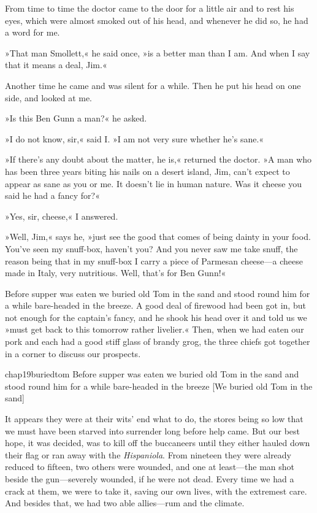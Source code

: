 From time to time the doctor came to the door for a little air and to rest his eyes, which were almost smoked out of his head, and whenever he did so, he had a word for me.

»That man Smollett,« he said once, »is a better man than I am. And when I say that it means a deal, Jim.«

Another time he came and was silent for a while. Then he put his head on one side, and looked at me.

»Is this Ben Gunn a man?« he asked.

»I do not know, sir,« said I. »I am not very sure whether he's sane.«

»If there's any doubt about the matter, he is,« returned the doctor. »A man who has been three years biting his nails on a desert island, Jim, can't expect to appear as sane as you or me. It doesn't lie in human nature. Was it cheese you said he had a fancy for?«

»Yes, sir, cheese,« I answered.

»Well, Jim,« says he, »just see the good that comes of being dainty in your food. You've seen my snuff-box, haven't you? And you never saw me take snuff, the reason being that in my snuff-box I carry a piece of Parmesan cheese—a cheese made in Italy, very nutritious. Well, that's for Ben Gunn!«

Before supper was eaten we buried old Tom in the sand and stood round him for a while bare-headed in the breeze. A good deal of firewood had been got in, but not enough for the captain's fancy, and he shook his head over it and told us we »must get back to this tomorrow rather livelier.« Then, when we had eaten our pork and each had a good stiff glass of brandy grog, the three chiefs got together in a corner to discuss our prospects.


\begin{bwbigpic}
	[\picsize]
	{chap19buriedtom}
	{Before supper was eaten we buried old Tom in the sand and stood round him for a while bare-headed in the breeze}
	[We buried old Tom in the sand]
\end{bwbigpic}

It appears they were at their wits' end what to do, the stores being so low that we must have been starved into surrender long before help came. But our best hope, it was decided, was to kill off the buccaneers until they either hauled down their flag or ran away with the \textit{Hispaniola}. From nineteen they were already reduced to fifteen, two others were wounded, and one at least—the man shot beside the gun—severely wounded, if he were not dead. Every time we had a crack at them, we were to take it, saving our own lives, with the extremest care. And besides that, we had two able allies—rum and the climate.

